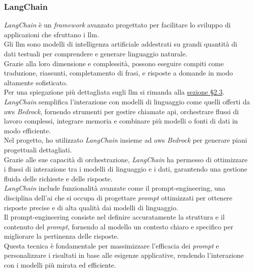 \subsubsection{LangChain}

\textit{LangChain} è un \textit{framework} avanzato progettato per facilitare lo sviluppo di applicazioni che sfruttano i \gls{llm}. \\
Gli \gls{llm} sono modelli di intelligenza artificiale addestrati su grandi quantità di dati testuali per comprendere e generare linguaggio naturale. \\
Grazie alla loro dimensione e complessità, possono eseguire compiti come traduzione, riassunti, completamento di frasi, e risposte a domande in modo altamente sofisticato.\\
Per una spiegazione più dettagliata sugli \gls{llm} si rimanda alla {\hyperref[sez:llm]{sezione §2.3}}.\\

\noindent \textit{LangChain} semplifica l'interazione con modelli di linguaggio come quelli offerti da \gls{aws} \textit{Bedrock}, fornendo strumenti per gestire chiamate \gls{api}, orchestrare flussi di lavoro complessi, integrare memoria e combinare più modelli o fonti di dati in modo efficiente.\\
Nel progetto, ho utilizzato \textit{LangChain} insieme ad \gls{aws} \textit{Bedrock} per generare piani progettuali dettagliati. \\
Grazie alle sue capacità di orchestrazione, \textit{LangChain} ha permesso di ottimizzare i flussi di interazione tra i modelli di linguaggio e i dati, garantendo una gestione fluida delle richieste e delle risposte.\\

\noindent \textit{LangChain} include funzionalità avanzate come il \gls{prompt-engineering}, una disciplina dell'\gls{ai} che si occupa di progettare \textit{prompt} ottimizzati per ottenere risposte precise e di alta qualità dai modelli di linguaggio.\\
Il \gls{prompt-engineering} consiste nel definire accuratamente la struttura e il contenuto del \textit{prompt}, fornendo al modello un contesto chiaro e specifico per migliorare la pertinenza delle risposte.\\
Questa tecnica è fondamentale per massimizzare l’efficacia dei \textit{prompt} e personalizzare i risultati in base alle esigenze applicative, rendendo l’interazione con i modelli più mirata ed efficiente.\\


